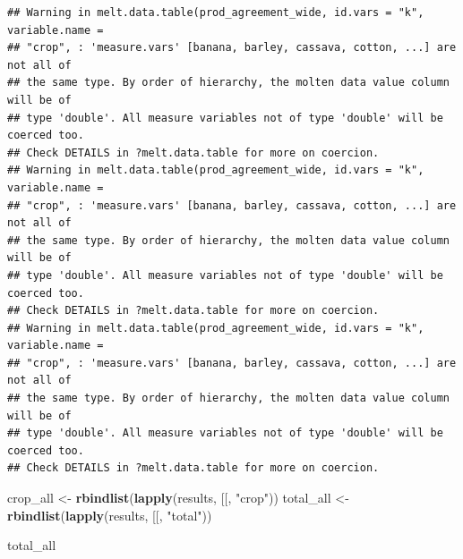 \documentclass[
  11pt,
]{article}
\newenvironment{Shaded}{\begin{snugshade}}{\end{snugshade}}
\newcommand{\AttributeTok}[1]{\textcolor[rgb]{0.13,0.29,0.53}{#1}}
\newcommand{\FunctionTok}[1]{\textcolor[rgb]{0.13,0.29,0.53}{\textbf{#1}}}
\newcommand{\NormalTok}[1]{#1}
\newcommand{\OtherTok}[1]{\textcolor[rgb]{0.56,0.35,0.01}{#1}}
\newcommand{\StringTok}[1]{\textcolor[rgb]{0.31,0.60,0.02}{#1}}
\begin{document}
\begin{verbatim}
## Warning in melt.data.table(prod_agreement_wide, id.vars = "k", variable.name =
## "crop", : 'measure.vars' [banana, barley, cassava, cotton, ...] are not all of
## the same type. By order of hierarchy, the molten data value column will be of
## type 'double'. All measure variables not of type 'double' will be coerced too.
## Check DETAILS in ?melt.data.table for more on coercion.
## Warning in melt.data.table(prod_agreement_wide, id.vars = "k", variable.name =
## "crop", : 'measure.vars' [banana, barley, cassava, cotton, ...] are not all of
## the same type. By order of hierarchy, the molten data value column will be of
## type 'double'. All measure variables not of type 'double' will be coerced too.
## Check DETAILS in ?melt.data.table for more on coercion.
## Warning in melt.data.table(prod_agreement_wide, id.vars = "k", variable.name =
## "crop", : 'measure.vars' [banana, barley, cassava, cotton, ...] are not all of
## the same type. By order of hierarchy, the molten data value column will be of
## type 'double'. All measure variables not of type 'double' will be coerced too.
## Check DETAILS in ?melt.data.table for more on coercion.
\end{verbatim}

\begin{Shaded}
\begin{Highlighting}[]
\NormalTok{crop\_all  }\OtherTok{\textless{}{-}} \FunctionTok{rbindlist}\NormalTok{(}\FunctionTok{lapply}\NormalTok{(results, }\StringTok{\textasciigrave{}}\AttributeTok{[[}\StringTok{\textasciigrave{}}\NormalTok{, }\StringTok{"crop"}\NormalTok{))}
\NormalTok{total\_all }\OtherTok{\textless{}{-}} \FunctionTok{rbindlist}\NormalTok{(}\FunctionTok{lapply}\NormalTok{(results, }\StringTok{\textasciigrave{}}\AttributeTok{[[}\StringTok{\textasciigrave{}}\NormalTok{, }\StringTok{"total"}\NormalTok{))}

\NormalTok{total\_all}
\end{Highlighting}
\end{Shaded}
\end{document}
